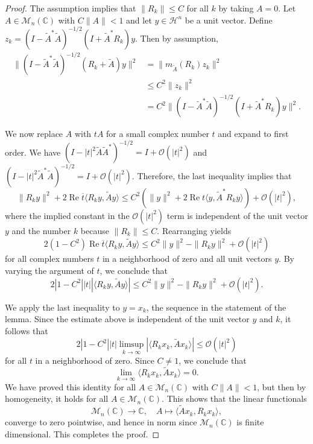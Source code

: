 \documentclass[12pt]{amsart}
\theoremstyle{definition}
\renewcommand{\Re}{\operatorname{Re}}
\newcommand\matn{{\mathcal M}_n}
\newcommand\ta{{\tilde{A}}}
\begin{document}
\begin{proof}
  The assumption implies that $\|R_k\| \le C$ for all $k$ by taking $A=0$.
  Let $A \in \matn(\mathbb{C})$ with $C \|A\| < 1$ and let $y \in \mathcal{H}^n$ be a unit vector.
  Define $z_k = (I - \ta^* \ta)^{-1/2} (I + \ta^* R_k) y$.
  Then by assumption,
  \begin{align*}
    \|(I - \ta^* \ta)^{-1/2} (R_k + \ta) y\|^2  &= \|m_\ta(R_k) z_k\|^2 \\ &\le C^2 \|z_k\|^2  \\
                                                        &= C^2 \|(I - \ta^* \ta)^{-1/2} (I + \ta^* R_k) y\|^2.
  \end{align*}

  We now replace $A$ with $t A$ for a small complex number $t$ and expand to first order.
  We have $(I - |t|^2 \ta \ta^*)^{-1/2} = I + \mathcal{O}(|t|^2)$ and $(I - |t|^2 \ta^* \ta)^{-1/2} = I + \mathcal{O}(|t|^2)$.
  Therefore, the last inequality implies that
  \begin{equation*}
    \|R_k y\|^2 + 2 \Re \overline{t} \langle R_k y, \ta y \rangle \le C^2 ( \|y\|^2 + 2 \Re t \langle y, \ta^* R_k y \rangle )
    + \mathcal{O}(|t|^2),
  \end{equation*}
  where the implied constant in the $\mathcal{O}(|t|^2)$ term is independent of the unit vector $y$ and the number $k$
  because $\|R_k\| \le C$.
  Rearranging yields
  \begin{equation*}
 2   (1 - C^2)  \Re \overline{t} \langle R_k y , \ta y \rangle \le C^2 \|y\|^2 - \|R_k y\|^2 + \mathcal{O}(|t|^2)
  \end{equation*}
  for all complex numbers $t$ in a neighborhood of zero and all unit vectors $y$.
  By varying the argument of $t$, we conclude that
  \begin{equation*}
   2 |1 - C^2|  |t| | \langle R_k y , \ta y \rangle| \le C^2 \|y\|^2 - \|R_k y\|^2 + \mathcal{O}(|t|^2).
  \end{equation*}

  We apply the last inequality to $y = x_k$, the sequence in the statement of the lemma. Since the estimate
  above is independent of the unit vector $y$ and $k$, it follows that
  \begin{equation*}
 2   |1 - C^2|  |t| \limsup_{k \to \infty} | \langle R_k x_k , \ta x_k \rangle| \le \mathcal{O}(|t|^2)
  \end{equation*}
  for all $t$ in a neighborhood of zero. Since $C \neq 1$, we conclude that
  \[
    \lim_{k \to \infty} \langle R_k x_k, \ta x_k \rangle = 0.
  \]
  We have proved this identity for all $A \in \matn(\mathbb{C})$ with $ C \|A\| < 1$,
  but then by homogeneity, it holds for all $A \in \matn(\mathbb{C})$. This shows that
  the linear functionals
  \begin{equation*}
    \matn(\mathbb{C}) \to \mathbb{C}, \quad A \mapsto \langle \ta x_k, R_k x_k \rangle,
  \end{equation*}
  converge to zero pointwise, and hence in norm since $\matn(\mathbb{C})$ is finite dimensional. This completes the proof.
\end{proof}
\end{document}
